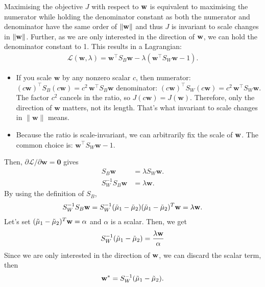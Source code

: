 Maximising the objective $J$ with respect to ${\mathbf{w}}$ is equivalent to maximising the numerator while holding the denominator constant as both the numerator and denominator have the same order of $\|{\mathbf{w}}\|$ and thus $J$ is invariant to scale changes in $\|{\mathbf{w}}\|$. Further, as we are only interested in the direction of ${\mathbf{w}}$, we can hold the denominator constant to 1. This results in a Lagrangian:
\begin{align*}
	\mathcal L(\mathbf w,\lambda)=\mathbf w^{\top}S_B\mathbf w-\lambda(\mathbf w^{\top}S_W\mathbf w-1).
\end{align*}
\begin{itemize}
	\item If you scale $\mathbf w$ by any nonzero scalar $c$, then numerator: $(c\mathbf w)^\top S_B (c\mathbf w)=c^2\,\mathbf w^\top S_B \mathbf w$ denominator: $(c\mathbf w)^\top S_W (c\mathbf w)=c^2\,\mathbf w^\top S_W \mathbf w$. The factor $c^2$ cancels in the ratio, so $J(c\mathbf w)=J(\mathbf w)$. Therefore, only the direction of $\mathbf w$ matters, not its length. That's what invariant to scale changes in $\|\mathbf w\|$ means.
	\item Because the ratio is scale-invariant, we can arbitrarily fix the scale of ${\mathbf{w}}$. The common choice is: $\mathbf w^{\top}S_W\mathbf w-1$.
\end{itemize}

Then, $\partial\mathcal L/\partial\mathbf w=\mathbf 0$ gives
\begin{align*}
	S_B\mathbf w&=\lambda S_W\mathbf w.\\
	S_W^{-1}S_B\mathbf w&=\lambda \mathbf w.
\end{align*}
By using the definition of $S_B$, 
\begin{align*}
	S_W^{-1}S_B{\mathbf{w}} = S_W^{-1}(\tilde{\mu}_1-\tilde{\mu}_2)(\tilde{\mu}_1-\tilde{\mu}_2)^T{\mathbf{w}} = \lambda {\mathbf{w}}.
\end{align*}
Let's set $(\tilde{\mu}_1-\tilde{\mu}_2)^T{\mathbf{w}} = \alpha$ and $\alpha$ is a scalar. Then, we get
\begin{align*}
	S_W^{-1}(\tilde{\mu}_1-\tilde{\mu}_2) = \frac{\lambda {\mathbf{w}}}{\alpha}
\end{align*}
Since we are only interested in the direction of ${\mathbf{w}}$, we can discard the scalar term, then
\begin{align*}
	{\mathbf{w}}^* = S_W^{-1}(\tilde{\mu}_1-\tilde{\mu}_2).
\end{align*}


